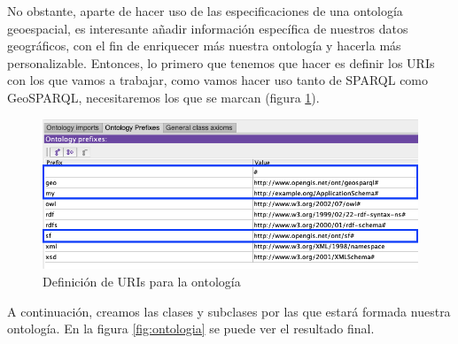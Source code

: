 No obstante, aparte de hacer uso de las especificaciones de una ontología geoespacial, es interesante añadir información específica de nuestros datos geográficos, con el fin de enriquecer más nuestra ontología y hacerla más personalizable. Entonces, lo primero que tenemos que hacer es definir los URIs con los que vamos a trabajar, como vamos hacer uso tanto de SPARQL como GeoSPARQL, necesitaremos los que se marcan (figura \ref{fig:prefijos}).
 

\begin{figure}[H]
	\centering
	\includegraphics[width=0.85\linewidth]{imagenes/capitulo5/prefijos}
	\caption{Definición de URIs para la ontología}
	\label{fig:prefijos}
\end{figure}

A continuación, creamos las clases y subclases por las que estará formada nuestra ontología. En la figura \ref{fig:ontologia} se puede ver el resultado final.


